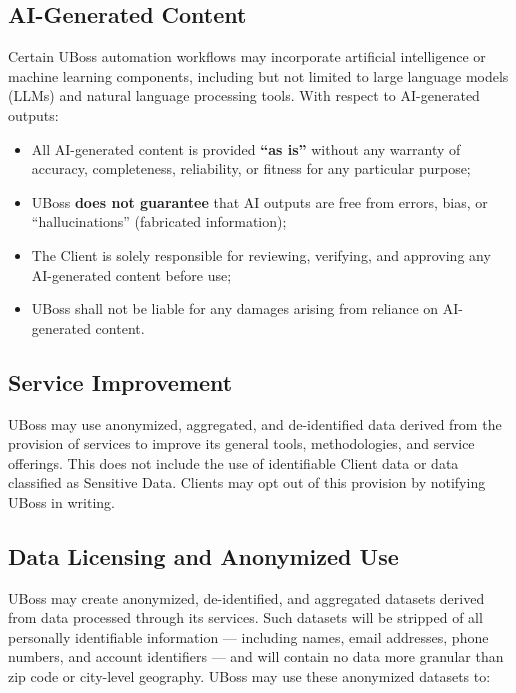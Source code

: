 \documentclass[11pt,letterpaper,parskip=half]{scrartcl}
\begin{document}
\subsection{AI-Generated Content}

\begin{tcolorbox}[keyterm, title={AI Disclaimer}]
Certain UBoss automation workflows may incorporate artificial intelligence or machine learning components, including but not limited to large language models (LLMs) and natural language processing tools. With respect to AI-generated outputs:
\begin{itemize}[nosep, leftmargin=1.5em]
    \item All AI-generated content is provided \textbf{``as is''} without any warranty of accuracy, completeness, reliability, or fitness for any particular purpose;
    \item UBoss \textbf{does not guarantee} that AI outputs are free from errors, bias, or ``hallucinations'' (fabricated information);
    \item The Client is solely responsible for reviewing, verifying, and approving any AI-generated content before use;
    \item UBoss shall not be liable for any damages arising from reliance on AI-generated content.
\end{itemize}
\end{tcolorbox}

\subsection{Service Improvement}

UBoss may use anonymized, aggregated, and de-identified data derived from the provision of services to improve its general tools, methodologies, and service offerings. This does not include the use of identifiable Client data or data classified as Sensitive Data. Clients may opt out of this provision by notifying UBoss in writing.

\subsection{Data Licensing and Anonymized Use}

UBoss may create anonymized, de-identified, and aggregated datasets derived from data processed through its services. Such datasets will be stripped of all personally identifiable information --- including names, email addresses, phone numbers, and account identifiers --- and will contain no data more granular than zip code or city-level geography. UBoss may use these anonymized datasets to:
\end{document}
